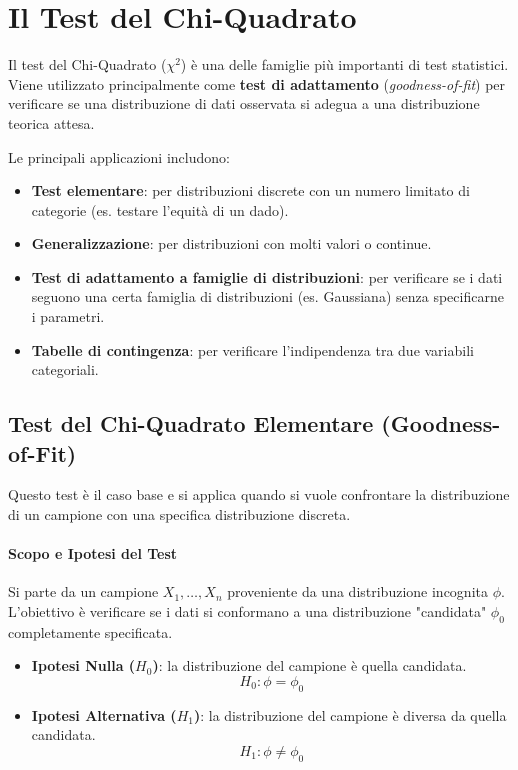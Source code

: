 \section{Il Test del Chi-Quadrato}

Il test del Chi-Quadrato (\(\chi^2\)) è una delle famiglie più importanti di
test statistici. Viene utilizzato principalmente come \textbf{test di
adattamento} (\textit{goodness-of-fit}) per verificare se una distribuzione di
dati osservata si adegua a una distribuzione teorica attesa.

Le principali applicazioni includono:
\begin{itemize}
    \item \textbf{Test elementare}: per distribuzioni discrete con un numero
    limitato di categorie (es. testare l'equità di un dado).
    \item \textbf{Generalizzazione}: per distribuzioni con molti valori o
    continue.
    \item \textbf{Test di adattamento a famiglie di distribuzioni}: per
    verificare se i dati seguono una certa famiglia di distribuzioni (es.
    Gaussiana) senza specificarne i parametri.
    \item \textbf{Tabelle di contingenza}: per verificare l'indipendenza tra due
    variabili categoriali.
\end{itemize}

\subsection{Test del Chi-Quadrato Elementare (Goodness-of-Fit)}
Questo test è il caso base e si applica quando si vuole confrontare la
distribuzione di un campione con una specifica distribuzione discreta.

\paragraph{Scopo e Ipotesi del Test}
Si parte da un campione \(X_1, \dots, X_n\) proveniente da una distribuzione
incognita \(\phi\). L'obiettivo è verificare se i dati si conformano a una
distribuzione "candidata" \(\phi_0\) completamente specificata.
\begin{itemize}
    \item \textbf{Ipotesi Nulla (\(H_0\))}: la distribuzione del campione è
    quella candidata.
    \[ H_0: \phi = \phi_0 \]
    \item \textbf{Ipotesi Alternativa (\(H_1\))}: la distribuzione del campione
    è diversa da quella candidata.
    \[ H_1: \phi \neq \phi_0 \]
\end{itemize}

